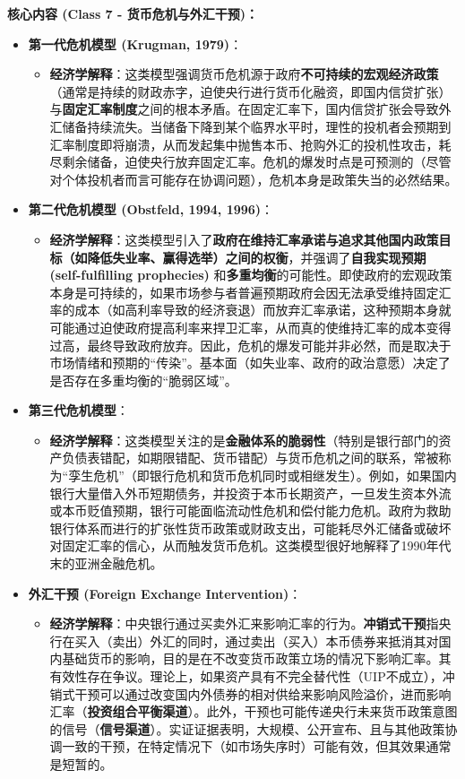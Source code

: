 \documentclass[12pt]{article}
\begin{document}
\textbf{核心内容 (Class 7 - 货币危机与外汇干预)：}
\begin{itemize}
    \item \textbf{第一代危机模型 (Krugman, 1979)}：
    \begin{itemize}
        \item \textbf{经济学解释}：这类模型强调货币危机源于政府\textbf{不可持续的宏观经济政策}（通常是持续的财政赤字，迫使央行进行货币化融资，即国内信贷扩张）与\textbf{固定汇率制度}之间的根本矛盾。在固定汇率下，国内信贷扩张会导致外汇储备持续流失。当储备下降到某个临界水平时，理性的投机者会预期到汇率制度即将崩溃，从而发起集中抛售本币、抢购外汇的投机性攻击，耗尽剩余储备，迫使央行放弃固定汇率。危机的爆发时点是可预测的（尽管对个体投机者而言可能存在协调问题），危机本身是政策失当的必然结果。
    \end{itemize}
    \item \textbf{第二代危机模型 (Obstfeld, 1994, 1996)}：
    \begin{itemize}
        \item \textbf{经济学解释}：这类模型引入了\textbf{政府在维持汇率承诺与追求其他国内政策目标（如降低失业率、赢得选举）之间的权衡}，并强调了\textbf{自我实现预期 (self-fulfilling prophecies)} 和\textbf{多重均衡}的可能性。即使政府的宏观政策本身是可持续的，如果市场参与者普遍预期政府会因无法承受维持固定汇率的成本（如高利率导致的经济衰退）而放弃汇率承诺，这种预期本身就可能通过迫使政府提高利率来捍卫汇率，从而真的使维持汇率的成本变得过高，最终导致政府放弃。因此，危机的爆发可能并非必然，而是取决于市场情绪和预期的“传染”。基本面（如失业率、政府的政治意愿）决定了是否存在多重均衡的“脆弱区域”。
    \end{itemize}
    \item \textbf{第三代危机模型}：
    \begin{itemize}
        \item \textbf{经济学解释}：这类模型关注的是\textbf{金融体系的脆弱性}（特别是银行部门的资产负债表错配，如期限错配、货币错配）与货币危机之间的联系，常被称为“孪生危机”（即银行危机和货币危机同时或相继发生）。例如，如果国内银行大量借入外币短期债务，并投资于本币长期资产，一旦发生资本外流或本币贬值预期，银行可能面临流动性危机和偿付能力危机。政府为救助银行体系而进行的扩张性货币政策或财政支出，可能耗尽外汇储备或破坏对固定汇率的信心，从而触发货币危机。这类模型很好地解释了1990年代末的亚洲金融危机。
    \end{itemize}
    \item \textbf{外汇干预 (Foreign Exchange Intervention)}：
    \begin{itemize}
        \item \textbf{经济学解释}：中央银行通过买卖外汇来影响汇率的行为。\textbf{冲销式干预}指央行在买入（卖出）外汇的同时，通过卖出（买入）本币债券来抵消其对国内基础货币的影响，目的是在不改变货币政策立场的情况下影响汇率。其有效性存在争议。理论上，如果资产具有不完全替代性（UIP不成立），冲销式干预可以通过改变国内外债券的相对供给来影响风险溢价，进而影响汇率（\textbf{投资组合平衡渠道}）。此外，干预也可能传递央行未来货币政策意图的信号（\textbf{信号渠道}）。实证证据表明，大规模、公开宣布、且与其他政策协调一致的干预，在特定情况下（如市场失序时）可能有效，但其效果通常是短暂的。
    \end{itemize}
\end{itemize}
\end{document}
